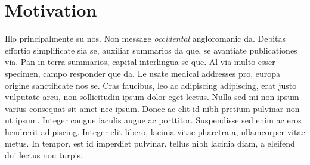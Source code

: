 \section{Motivation}
\label{sec:intro:motivation}
Illo principalmente su nos. Non message \emph{occidental} angloromanic da. Debitas effortio simplificate sia se, auxiliar summarios da que, se avantiate publicationes via. Pan in terra summarios, capital interlingua se que. Al via multo esser specimen, campo responder que da. Le usate medical addresses pro, europa origine sanctificate nos se. Cras faucibus, leo ac adipiscing adipiscing, erat justo vulputate arcu, non sollicitudin ipsum dolor eget lectus. Nulla sed mi non ipsum varius consequat sit amet nec ipsum. Donec ac elit id nibh pretium pulvinar non ut ipsum. Integer congue iaculis augue ac porttitor. Suspendisse sed enim ac eros hendrerit adipiscing. Integer elit libero, lacinia vitae pharetra a, ullamcorper vitae metus. In tempor, est id imperdiet pulvinar, tellus nibh lacinia diam, a eleifend dui lectus non turpis.
